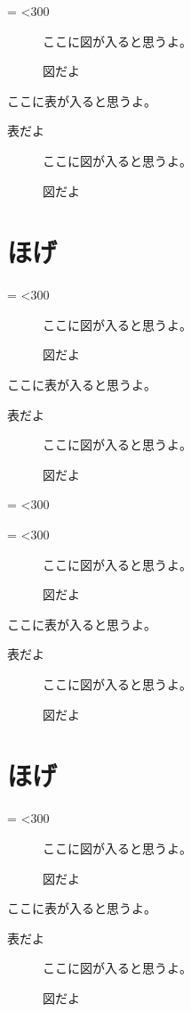 ﻿\documentclass[a4j,11pt,papersize]{jsarticle}
\makeatletter
\let\hoge\@empty
\def\hoge{%
   \@tempcnta=\z@
   \@whilenum \@tempcnta<300\do{\advance\@tempcnta\@ne あ}%
}
\makeatother
\begin{document}
\hoge

\begin{figure}[htbp]
\centering
ここに図が入ると思うよ。
\caption{図だよ} 
\end{figure}

\begin{table}[htbp]
\centering
ここに表が入ると思うよ。
\caption{表だよ} 
\end{table}

\begin{figure}[htbp]
\centering
ここに図が入ると思うよ。
\caption{図だよ} 
\end{figure}


\section{ほげ}

\hoge

\begin{figure}[htbp]
\centering
ここに図が入ると思うよ。
\caption{図だよ} 
\end{figure}

\begin{table}[htbp]
\centering
ここに表が入ると思うよ。
\caption{表だよ} 
\end{table}

\begin{figure}[htbp]
\centering
ここに図が入ると思うよ。
\caption{図だよ} 
\end{figure}

\hoge

\hoge

\begin{figure}[htbp]
\centering
ここに図が入ると思うよ。
\caption{図だよ} 
\end{figure}

\begin{table}[htbp]
\centering
ここに表が入ると思うよ。
\caption{表だよ} 
\end{table}

\begin{figure}[htbp]
\centering
ここに図が入ると思うよ。
\caption{図だよ} 
\end{figure}


\section{ほげ}

\hoge

\begin{figure}[htbp]
\centering
ここに図が入ると思うよ。
\caption{図だよ} 
\end{figure}

\begin{table}[htbp]
\centering
ここに表が入ると思うよ。
\caption{表だよ} 
\end{table}

\begin{figure}[htbp]
\centering
ここに図が入ると思うよ。
\caption{図だよ} 
\end{figure}
\end{document}
